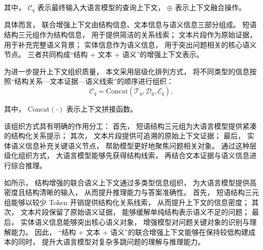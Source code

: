 \noindent 其中，
$\mathcal{C}_q$ 表示最终输入大语言模型的查询上下文，
$\oplus$ 表示上下文融合操作。

具体而言，
联合增强上下文由结构信息、文本信息与语义信息三部分组成。
短语结构三元组作为结构信息，
用于提供简洁的关系线索；
文本片段作为原始证据，
用于补充完整语义背景；
实体信息作为语义信息，
用于突出问题相关的核心语义节点。
三者共同构成“结构 + 文本 + 语义”的增强上下文表示。

为进一步提升上下文组织质量，
本文采用层级化排列方式，
将不同类型的信息按照“结构关系—文本证据—语义线索”的顺序进行组织：
\begin{equation}
\mathcal{C}_q =
\text{Concat}(\mathcal{T}_q,\mathcal{D}_q,\mathcal{E}_q),
\end{equation}

\noindent 其中，
$\text{Concat}(\cdot)$ 表示上下文拼接函数。

该组织方式具有明确的作用分工：
首先，
短语结构三元组为大语言模型提供紧凑的结构化关系提示；
其次，
文本片段提供可追溯的原始上下文证据；
最后，
实体语义信息补充关键语义节点，
帮助模型更好地聚焦问题相关对象。
通过这种层级化组织方式，
大语言模型能够先获得结构线索，
再结合文本证据与语义信息进行综合推理。

如所示，
结构增强的联合语义上下文通过多类型信息组织，
为大语言模型提供高密度且结构清晰的输入，
从而提升推理能力与答案准确性。
首先，
短语结构三元组能够以较少 Token 开销提供结构化关系线索，
从而提升上下文的信息密度；
其次，
文本片段保留了原始语义证据，
能够缓解单纯结构表示语义不足的问题；
最后，
实体语义信息能够突出核心语义对象，
增强模型对问题关键对象的识别与理解能力。
因此，
“结构 + 文本 + 语义”的联合增强上下文能够在保持较低构建成本的同时，
提升大语言模型对复杂多跳问题的理解与推理能力。

